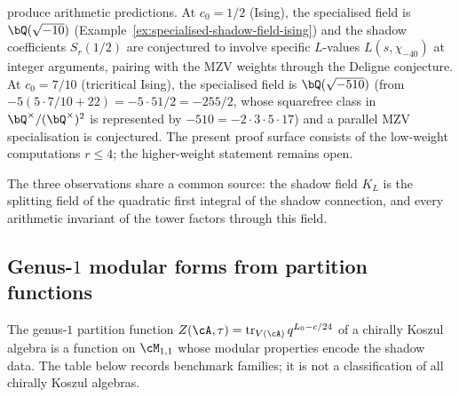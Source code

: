 \begin{remark}
\begin{enumerate}[label=\textup{(\roman*)}]
produce arithmetic predictions. At $c_0 = 1/2$
\textup{(}Ising\textup{)}, the specialised field is
$\bQ(\sqrt{-10})$
\textup{(}Example~\textup{\ref{ex:specialised-shadow-field-ising}}\textup{)}
and the shadow coefficients $S_r(1/2)$ are conjectured to
involve specific $L$-values $L(s, \chi_{-40})$ at
integer arguments, pairing with the MZV weights through
the Deligne conjecture.
At $c_0 = 7/10$ \textup{(}tricritical Ising\textup{)},
the specialised field is $\bQ(\sqrt{-510})$
\textup{(}from $-5(5 \cdot 7/10 + 22) = -5 \cdot 51/2
= -255/2$, whose squarefree class in
$\bQ^\times/(\bQ^\times)^2$ is represented by
$-510 = -2 \cdot 3 \cdot 5 \cdot 17$\textup{)} and
a parallel MZV specialisation is conjectured. The present proof
surface consists of the low-weight computations $r \leq 4$; the
higher-weight statement remains open.
\end{enumerate}
The three observations share a common source: the
shadow field $K_L$ is the splitting field of the
quadratic first integral of the shadow connection, and
every arithmetic invariant of the tower factors through
this field.
\end{remark}

\subsection{Genus-$1$ modular forms from partition functions}%
\label{subsec:genus1-modular-forms-partition}%
%

The genus-$1$ partition function $Z(\cA, \tau) =
\operatorname{tr}_{V(\cA)} q^{L_0 - c/24}$ of a chirally
Koszul algebra is a function on $\cM_{1,1}$ whose modular
properties encode the shadow data. The table below records benchmark
families; it is not a classification of all chirally Koszul algebras.

